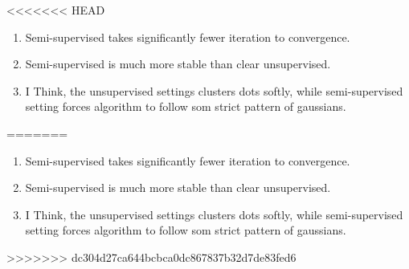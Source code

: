 <<<<<<< HEAD
\begin{answer}
\begin{enumerate}[label=\roman*.]
    \item Semi-supervised takes significantly fewer iteration to convergence.
    \item Semi-supervised is much more stable than clear unsupervised.
    \item I Think, the unsupervised settings clusters dots softly, while semi-supervised setting forces algorithm to follow som strict pattern of gaussians.
\end{enumerate}
\end{answer}
=======
\begin{answer}
\begin{enumerate}[label=\roman*.]
    \item Semi-supervised takes significantly fewer iteration to convergence.
    \item Semi-supervised is much more stable than clear unsupervised.
    \item I Think, the unsupervised settings clusters dots softly, while semi-supervised setting forces algorithm to follow som strict pattern of gaussians.
\end{enumerate}
\end{answer}
>>>>>>> dc304d27ca644bcbca0dc867837b32d7de83fed6
